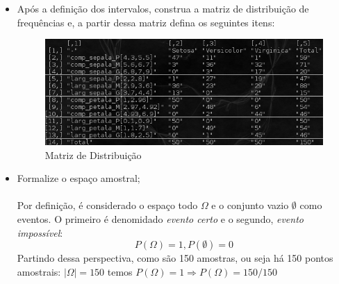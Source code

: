\documentclass[a4paper, 12pt]{article}
\begin{document}
\begin{itemize}
\item Após a definição dos intervalos, construa a matriz de distribuição de frequências e, a partir dessa matriz defina os seguintes itens:\\
  \begin{figure}[ht!]
    \centering
    \includegraphics[width=150mm]{img1.png}
    \caption{Matriz de Distribuição}
  \end{figure}

\item Formalize o espaço amostral;\\\\
  Por definição, é considerado o espaço todo $\Omega$ e o conjunto vazio $\emptyset$ como eventos. O primeiro é denomidado \emph{evento certo} e o segundo, \emph{evento impossível}:\\
  $$P(\Omega)=1, P(\emptyset)=0$$
  Partindo dessa perspectiva, como são 150 amostras, ou seja há 150 pontos amostrais: $\left\vert{\Omega}\right\vert = 150$ temos $P(\Omega)=1 \Rightarrow P(\Omega)=150/150$


\end{itemize}
\end{document}

